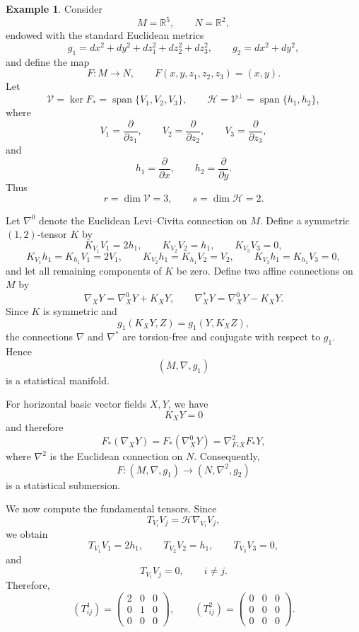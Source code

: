 \documentclass[10pt,a4paper]{article}
\theoremstyle{definition}
\newtheorem{example}[theorem]{Example}
\theoremstyle{remark}
\numberwithin{equation}{section}
\begin{document}
\begin{example}
Consider
\[
M=\mathbb{R}^{5},\qquad N=\mathbb{R}^{2},
\]
endowed with the standard Euclidean metrics
\[
g_{1}
=
dx^{2}+dy^{2}+dz_{1}^{2}+dz_{2}^{2}+dz_{3}^{2},
\qquad
g_{2}=dx^{2}+dy^{2},
\]
and define the map
\[
F:M\longrightarrow N,\qquad
F(x,y,z_{1},z_{2},z_{3})=(x,y).
\]
Let
\[
\mathcal{V}=\ker F_{*}
=
\operatorname{span}\{V_{1},V_{2},V_{3}\},
\qquad
\mathcal{H}=\mathcal{V}^{\perp}
=
\operatorname{span}\{h_{1},h_{2}\},
\]
where
\[
V_{1}=\frac{\partial}{\partial z_{1}},
\qquad
V_{2}=\frac{\partial}{\partial z_{2}},
\qquad
V_{3}=\frac{\partial}{\partial z_{3}},
\]
and
\[
h_{1}=\frac{\partial}{\partial x},
\qquad
h_{2}=\frac{\partial}{\partial y}.
\]
Thus
\[
r=\dim\mathcal{V}=3,
\qquad
s=\dim\mathcal{H}=2.
\]

Let $\nabla^{0}$ denote the Euclidean Levi--Civita connection on
$M$. Define a symmetric $(1,2)$-tensor $K$ by
\[
K_{V_{1}}V_{1}=2h_{1},
\qquad
K_{V_{2}}V_{2}=h_{1},
\qquad
K_{V_{3}}V_{3}=0,
\]
\[
K_{V_{1}}h_{1}
=
K_{h_{1}}V_{1}
=
2V_{1},
\qquad
K_{V_{2}}h_{1}
=
K_{h_{1}}V_{2}
=
V_{2},
\qquad
K_{V_{3}}h_{1}
=
K_{h_{1}}V_{3}
=
0,
\]
and let all remaining components of $K$ be zero. Define two affine
connections on $M$ by
\[
\nabla_{X}Y=\nabla^{0}_{X}Y+K_{X}Y,
\qquad
\nabla^{*}_{X}Y=\nabla^{0}_{X}Y-K_{X}Y.
\]
Since $K$ is symmetric and
\[
g_{1}(K_{X}Y,Z)=g_{1}(Y,K_{X}Z),
\]
the connections $\nabla$ and $\nabla^{*}$ are torsion-free and
conjugate with respect to $g_{1}$. Hence
\[
(M,\nabla,g_{1})
\]
is a statistical manifold.

For horizontal basic vector fields $X,Y$, we have
\[
K_{X}Y=0
\]
and therefore
\[
F_{*}(\nabla_{X}Y)
=
F_{*}(\nabla^{0}_{X}Y)
=
\nabla^{2}_{F_{*}X}F_{*}Y,
\]
where $\nabla^{2}$ is the Euclidean connection on $N$. Consequently,
\[
F:(M,\nabla,g_{1})
\longrightarrow
(N,\nabla^{2},g_{2})
\]
is a statistical submersion.

We now compute the fundamental tensors. Since
\[
T_{V_{i}}V_{j}
=
\mathcal{H}\nabla_{V_{i}}V_{j},
\]
we obtain
\[
T_{V_{1}}V_{1}=2h_{1},
\qquad
T_{V_{2}}V_{2}=h_{1},
\qquad
T_{V_{3}}V_{3}=0,
\]
and
\[
T_{V_{i}}V_{j}=0,
\qquad i\neq j.
\]
Therefore,
\[
\left(T^{1}_{ij}\right)
=
\begin{pmatrix}
2&0&0\\
0&1&0\\
0&0&0
\end{pmatrix},
\qquad
\left(T^{2}_{ij}\right)
=
\begin{pmatrix}
0&0&0\\
0&0&0\\
0&0&0
\end{pmatrix}.
\]


\end{example}
\end{document}
